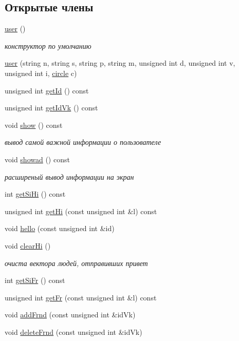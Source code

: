 \subsection*{Открытые члены}
\begin{DoxyCompactItemize}
\item 
\hyperlink{classuser_a86f00bd9662cde8219dfd4601097fa3c}{user} ()
\begin{DoxyCompactList}\small\item\em конструктор по умолчанию \end{DoxyCompactList}\item 
\hyperlink{classuser_ae45f1bafa984f122d9d5eb6740f2d545}{user} (string n, string s, string p, string m, unsigned int d, unsigned int v, unsigned int i, \hyperlink{classcircle}{circle} c)
\item 
unsigned int \hyperlink{classuser_ac5da3a95d4b0afc2b4a3f007138665ba}{get\-Id} () const 
\item 
unsigned int \hyperlink{classuser_a81accd6ff251050e75c3907b0b974fdd}{get\-Id\-Vk} () const 
\item 
void \hyperlink{classuser_a94f7a39e4562af925d339fb62dcf6b51}{show} () const 
\begin{DoxyCompactList}\small\item\em вывод самой важной информации о пользователе \end{DoxyCompactList}\item 
void \hyperlink{classuser_ae52afec3c032697288e12b4c898f8f58}{showad} () const 
\begin{DoxyCompactList}\small\item\em расширеный вывод информации на экран \end{DoxyCompactList}\item 
int \hyperlink{classuser_aa14a0ed8834e2314bea554dba24eb4b9}{get\-Si\-Hi} () const 
\item 
unsigned int \hyperlink{classuser_aa6ed6a662ee8c07105ce1fb0a58c3532}{get\-Hi} (const unsigned int \&l) const 
\item 
void \hyperlink{classuser_a6cf4003d298be5ecb383242f4639bdb9}{hello} (const unsigned int \&id)
\item 
void \hyperlink{classuser_aedb931481b8ea24e8170923823251790}{clear\-Hi} ()
\begin{DoxyCompactList}\small\item\em очиста вектора людей, отправивших привет \end{DoxyCompactList}\item 
int \hyperlink{classuser_a151262fa947be0aa4b4e60815fa30311}{get\-Si\-Fr} () const 
\item 
unsigned int \hyperlink{classuser_a7ad76f62c70b27c04364868d06dd9122}{get\-Fr} (const unsigned int \&l) const 
\item 
void \hyperlink{classuser_a8bb439019ca20f3ccdbf8665ad0e7713}{add\-Frnd} (const unsigned int \&id\-Vk)
\item 
void \hyperlink{classuser_a032d35412b49df18b46a0bc17fd9747e}{delete\-Frnd} (const unsigned int \&id\-Vk)
\end{DoxyCompactItemize}
